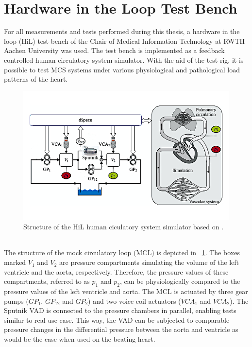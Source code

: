 \section{Hardware in the Loop Test Bench}
For all measurements and tests performed during this thesis, a hardware in the loop (HiL) test bench of the Chair of Medical Information Technology at RWTH Aachen University was used. The test bench is implemented as a feedback controlled human circulatory system simulator. With the aid of the test rig, it is possible to test MCS systems under various physiological and pathological load patterns of the heart.
\begin{figure}[ht]
  \centering
  \includegraphics[width=\textwidth]{images/chapt_4/mock_loop.jpg}
  \caption[HiL test bench]{Structure of the HiL human ciculatory system simulator based on \cite{MCL}.}
  \label{fig:mock_loop}
\end{figure}
\\The structure of the mock circulatory loop (MCL) is depicted in \figurename~\ref{fig:mock_loop}. The boxes marked $V_{1}$ and $V_{2}$ are pressure compartments simulating the volume of the left ventricle and the aorta, respectively. Therefore, the pressure values of these compartments, referred to as $p_{1}$ and $p_{2}$, can be physiologically compared to the pressure values of the left ventricle and aorta. The MCL is actuated by three gear pumps ($GP_{1}$, $GP_{12}$ and $GP_{2}$) and two voice coil actuators ($VCA_{1}$ and $VCA_{2}$). The Sputnik VAD is connected to the pressure chambers in parallel, enabling tests similar to real use case. This way, the VAD can be subjected to comparable pressure changes in the differential pressure between the aorta and ventricle as would be the case when used on the beating heart.
